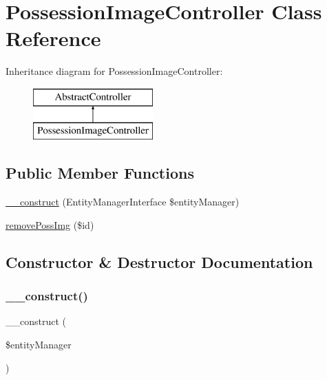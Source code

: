 \hypertarget{class_app_1_1_controller_1_1_possession_image_controller}{}\section{Possession\+Image\+Controller Class Reference}
\label{class_app_1_1_controller_1_1_possession_image_controller}
Inheritance diagram for Possession\+Image\+Controller\+:\begin{figure}[H]
\begin{center}
\leavevmode
\includegraphics[height=2.000000cm]{class_app_1_1_controller_1_1_possession_image_controller}
\end{center}
\end{figure}
\subsection*{Public Member Functions}
\begin{DoxyCompactItemize}
\item 
\mbox{\hyperlink{class_app_1_1_controller_1_1_possession_image_controller_abb5fb9a65dd8a81e7482dddbf71c5177}{\+\_\+\+\_\+construct}} (Entity\+Manager\+Interface \$entity\+Manager)
\item 
\mbox{\hyperlink{class_app_1_1_controller_1_1_possession_image_controller_a68e59335ed2c9c59f8868e7a81dadb85}{remove\+Poss\+Img}} (\$id)
\end{DoxyCompactItemize}


\subsection{Constructor \& Destructor Documentation}
\mbox{\label{class_app_1_1_controller_1_1_possession_image_controller_abb5fb9a65dd8a81e7482dddbf71c5177}} 
\subsubsection{\texorpdfstring{\_\_construct()}{\_\_construct()}}
{\footnotesize\ttfamily \+\_\+\+\_\+construct (\begin{DoxyParamCaption}\item[{Entity\+Manager\+Interface}]{\$entity\+Manager }\end{DoxyParamCaption})}

